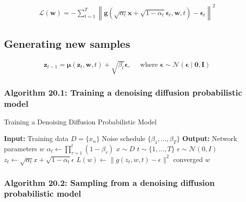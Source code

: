 \documentclass{article}
\begin{document}
\begin{align*}
\mathcal{L}(\mathbf{w})=-\sum_{t=1}^{T}\left\|\mathbf{g}\left(\sqrt{\alpha_{t}} \mathbf{x}+\sqrt{1-\alpha_{t}} \boldsymbol{\epsilon}_{t}, \mathbf{w}, t\right)-\boldsymbol{\epsilon}_{t}\right\|^{2} 
\tag{20.40}
\end{align*}

\subsection{Generating new samples}

\begin{align*}
\mathbf{z}_{t-1}=\boldsymbol{\mu}\left(\mathbf{z}_{t}, \mathbf{w}, t\right)+\sqrt{\beta_{t}} \boldsymbol{\epsilon}, \quad \text{ where } \boldsymbol{\epsilon} \sim \mathcal{N}(\boldsymbol{\epsilon} \mid \mathbf{0}, \mathbf{I})
\tag{20.41}
\end{align*}

\subsubsection{Algorithm 20.1: Training a denoising diffusion probabilistic model}

\begin{algorithm}[H]
\caption{Training a Denoising Diffusion Probabilistic Model}
\begin{algorithmic}[1]
\STATE \textbf{Input:} Training data $D = \{x_n\}$
\STATE \quad Noise schedule $\{\beta_1, \ldots, \beta_T\}$
\STATE \textbf{Output:} Network parameters $w$
    \STATE $\alpha_t \gets \prod_{\tau=1}^{t} (1 - \beta_\tau)$ 
\ENDFOR
\REPEAT
    \STATE $x \sim D$ 
    \STATE $t \sim \{1, \ldots, T\}$ 
    \STATE $\epsilon \sim \mathcal{N}(0, I)$ 
    \STATE $z_t \gets \sqrt{\alpha_t} x + \sqrt{1 - \alpha_t} \epsilon$ 
    \STATE $L(w) \gets \|g(z_t, w, t) - \epsilon\|^2$ 
    \STATE {}
\UNTIL converged
\RETURN $w$
\end{algorithmic}
\end{algorithm}

\subsubsection{Algorithm 20.2: Sampling from a denoising diffusion probabilistic model}
\end{document}
